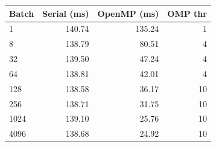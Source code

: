 \begin{tabular}{lrrr}
\toprule
Batch & Serial (ms) & OpenMP (ms) & OMP thr \\
\midrule
1 & 140.74 & 135.24 & 1 \\
8 & 138.79 & 80.51 & 4 \\
32 & 139.50 & 47.24 & 4 \\
64 & 138.81 & 42.01 & 4 \\
128 & 138.58 & 36.17 & 10 \\
256 & 138.71 & 31.75 & 10 \\
1024 & 139.10 & 25.76 & 10 \\
4096 & 138.68 & 24.92 & 10 \\
\bottomrule
\end{tabular}
